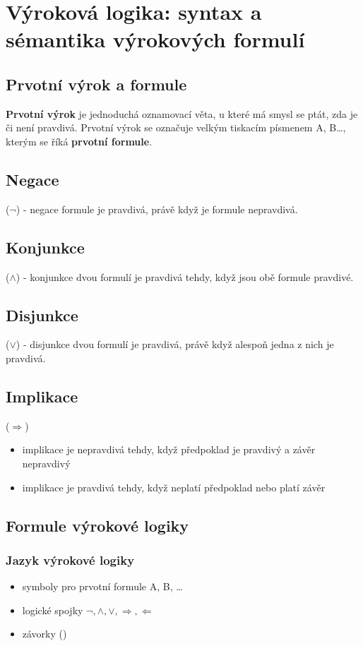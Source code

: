 \documentclass{szzclass}
\author{Jakub Rathouský}
\begin{document}
\tableofcontents
\newpage

\section{Výroková logika: syntax a sémantika výrokových formulí}
\subsection{Prvotní výrok a formule}
\textbf{Prvotní výrok} je jednoduchá oznamovací věta, u které má smysl se ptát, zda je či není pravdivá.
Prvotní výrok se označuje velkým tiskacím písmenem A, B\dots, kterým se říká \textbf{prvotní formule}.
\subsection{Negace}
($\neg$) - negace formule je pravdivá, právě když je formule nepravdivá.
\subsection{Konjunkce}
($\wedge$) - konjunkce dvou formulí je pravdivá tehdy, když jsou obě formule pravdivé.
\subsection{Disjunkce}
($\vee$) - disjunkce dvou formulí je pravdivá, právě když alespoň jedna z nich je pravdivá.
\subsection{Implikace}
($\Rightarrow$)
\begin{itemize}
	\item implikace je nepravdivá tehdy, když předpoklad je pravdivý a závěr nepravdivý
	\item implikace je pravdivá tehdy, když neplatí předpoklad nebo platí závěr
\end{itemize}
\subsection{Formule výrokové logiky}
\subsubsection{Jazyk výrokové logiky}
\begin{itemize}
	\item symboly pro prvotní formule A, B, \dots
	\item logické spojky $\neg, \wedge, \vee, \Rightarrow, \Leftarrow$
	\item závorky ()
\end{itemize}
\end{document}
